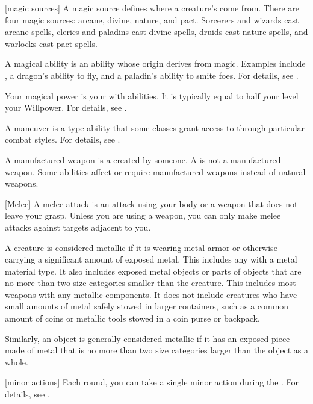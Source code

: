 [magic sources] A magic source defines where a creature's  come from.
There are four magic sources: arcane, divine, nature, and pact.
Sorcerers and wizards cast arcane spells, clerics and paladins cast divine spells, druids cast nature spells, and warlocks cast pact spells.

 A magical ability is an ability whose origin derives from magic.
Examples include , a dragon's ability to fly, and a paladin's ability to smite foes.
For details, see .

 Your magical power is your  with \magical abilities.
It is typically equal to half your level \add your Willpower.
For details, see .

 A maneuver is a type  ability that some classes grant access to through particular combat styles.
For details, see .

 A manufactured weapon is a  created by someone.
A  is not a manufactured weapon. 
Some abilities affect or require manufactured weapons instead of natural weapons.

[Melee] A melee attack is an attack using your body or a weapon that does not leave your grasp.
Unless you are using a  weapon, you can only make melee attacks against targets adjacent to you.

 A creature is considered metallic if it is wearing metal armor or otherwise carrying a significant amount of exposed metal.
This includes any  with a metal material type.
It also includes exposed metal objects or parts of objects that are no more than two size categories smaller than the creature.
This includes most weapons with any metallic components.
It does not include creatures who have small amounts of metal safely stowed in larger containers, such as a common amount of coins or metallic tools stowed in a coin purse or backpack.

Similarly, an object is generally considered metallic if it has an exposed piece made of metal that is no more than two size categories larger than the object as a whole.

[minor actions] Each round, you can take a single minor action during the .
For details, see .

